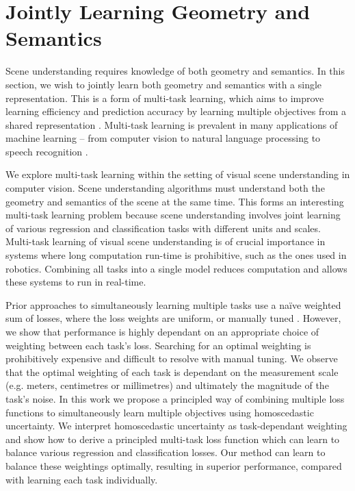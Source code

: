 \section{Jointly Learning Geometry and Semantics}
\label{sec:mlttask}

Scene understanding requires knowledge of both geometry and semantics. In this section, we wish to jointly learn both geometry and semantics with a single representation.
This is a form of multi-task learning, which aims to improve learning efficiency and prediction accuracy by learning multiple objectives from a shared representation \citep{caruana1998multitask}. Multi-task learning is prevalent in many applications of machine learning -- from computer vision \citep{kokkinos2016ubernet} to natural language processing \citep{collobert2008unified} to speech recognition \citep{huang2013cross}.

We explore multi-task learning within the setting of visual scene understanding in computer vision. Scene understanding algorithms must understand both the geometry and semantics of the scene at the same time. This forms an interesting multi-task learning problem because scene understanding involves joint learning of various regression and classification tasks with different units and scales. Multi-task learning of visual scene understanding is of crucial importance in systems where long computation run-time is prohibitive, such as the ones used in robotics. Combining all tasks into a single model reduces computation and allows these systems to run in real-time.

Prior approaches to simultaneously learning multiple tasks use a na{\"i}ve weighted sum of losses, where the loss weights are uniform, or manually tuned \citep{sermanet2013overfeat,kokkinos2016ubernet,eigen2015predicting}. However, we show that performance is highly dependant on an appropriate choice of weighting between each task's loss. Searching for an optimal weighting is prohibitively expensive and difficult to resolve with manual tuning. We observe that the optimal weighting of each task is dependant on the measurement scale (e.g. meters, centimetres or millimetres) and ultimately the magnitude of the task's noise. In this work we propose a principled way of combining multiple loss functions to simultaneously learn multiple objectives using homoscedastic uncertainty. We interpret homoscedastic uncertainty as task-dependant weighting and show how to derive a principled multi-task loss function which can learn to balance various regression and classification losses. Our method can learn to balance these weightings optimally, resulting in superior performance, compared with learning each task individually. 

